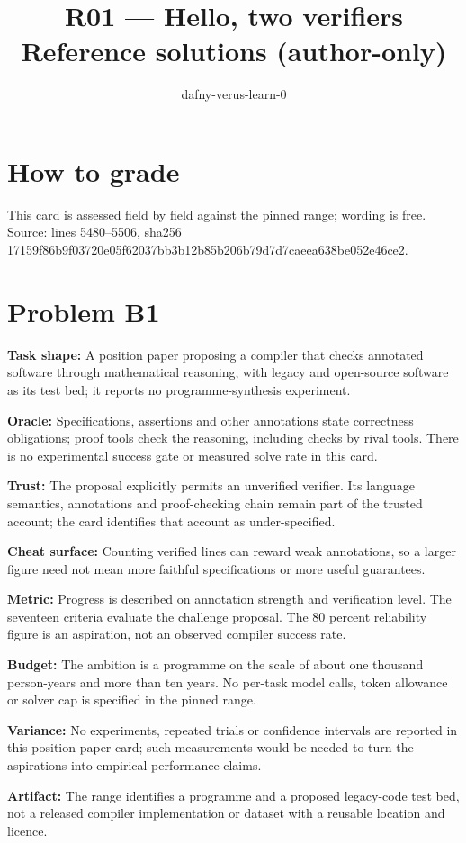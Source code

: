 \documentclass[11pt]{article}
\title{R01 --- Hello, two verifiers \\ \large Reference solutions (author-only)}
\author{dafny-verus-learn-0}
\date{}
\begin{document}
\maketitle
\section*{How to grade}
This card is assessed field by field against the pinned range; wording is free.
Source: lines 5480--5506, sha256 17159f86b9f03720e05f62037bb3b12b85b206b79d7d7caeea638be052e46ce2.

\section*{Problem B1}\label{ans:B1}
\begin{answer}
\textbf{Task shape:} A position paper proposing a compiler that checks annotated software through mathematical reasoning, with legacy and open-source software as its test bed; it reports no programme-synthesis experiment.

\textbf{Oracle:} Specifications, assertions and other annotations state correctness obligations; proof tools check the reasoning, including checks by rival tools. There is no experimental success gate or measured solve rate in this card.

\textbf{Trust:} The proposal explicitly permits an unverified verifier. Its language semantics, annotations and proof-checking chain remain part of the trusted account; the card identifies that account as under-specified.

\textbf{Cheat surface:} Counting verified lines can reward weak annotations, so a larger figure need not mean more faithful specifications or more useful guarantees.

\textbf{Metric:} Progress is described on annotation strength and verification level. The seventeen criteria evaluate the challenge proposal. The 80 percent reliability figure is an aspiration, not an observed compiler success rate.

\textbf{Budget:} The ambition is a programme on the scale of about one thousand person-years and more than ten years. No per-task model calls, token allowance or solver cap is specified in the pinned range.

\textbf{Variance:} No experiments, repeated trials or confidence intervals are reported in this position-paper card; such measurements would be needed to turn the aspirations into empirical performance claims.

\textbf{Artifact:} The range identifies a programme and a proposed legacy-code test bed, not a released compiler implementation or dataset with a reusable location and licence.
\end{answer}
\end{document}
